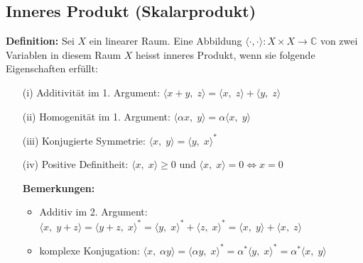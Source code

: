 \documentclass[11pt]{article}
\begin{document}
\vspace*{-0.75cm}
\subsection*{Inneres Produkt (Skalarprodukt)}
\vspace*{-0.5cm}
\textbf{Definition:} Sei $X$ ein linearer Raum. Eine Abbildung $\langle \cdot, \cdot \rangle : X \times X \to \mathbb{C}$ von zwei Variablen in diesem Raum $X$ heisst inneres Produkt, wenn sie folgende Eigenschaften erfüllt:
\vspace*{-0.5cm}
\begin{itemize}
    \item[(i)] Additivität im 1. Argument: $\langle x + y, \; z\rangle = \langle x, \; z\rangle + \langle y, \; z\rangle$
    \item[(ii)] Homogenität im 1. Argument: $\langle \alpha x, \; y \rangle = \alpha \langle x, \; y \rangle$
    \item[(iii)] Konjugierte Symmetrie: $\langle x, \; y\rangle = \langle y, \; x\rangle^*$
    \item[(iv)] Positive Definitheit: $\langle x, \; x\rangle \geq 0$ und $\langle x, \; x\rangle = 0 \Leftrightarrow x = 0$
\end{itemize}

\vspace*{-0.75cm}
\begin{itemize}[leftmargin = 0pt]

    \item[] \textbf{Bemerkungen:}\begin{itemize}
        \item Additiv im 2. Argument: $\langle x, \; y+z \rangle = \langle y + z, \; x \rangle^* = \langle y, \; x \rangle^* + \langle z, \; x \rangle^* = \langle x, \; y \rangle + \langle x, \; z \rangle$
        \item komplexe Konjugation: $\langle x, \; \alpha y\rangle = \langle \alpha y, \; x \rangle^* = \alpha^* \langle y, \; x \rangle^* = \alpha^* \langle x, \; y \rangle$
    \end{itemize}
\end{itemize}
\end{document}
